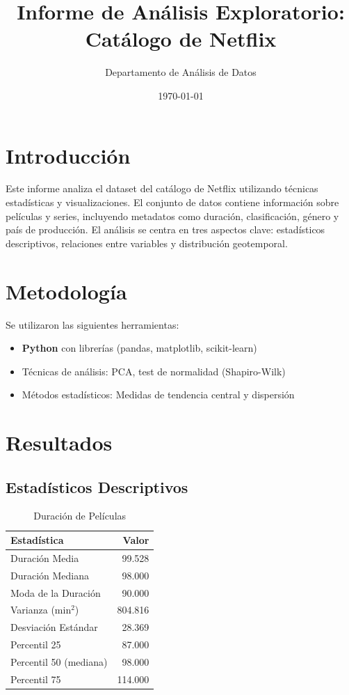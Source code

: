 \documentclass{article}
\title{Informe de Análisis Exploratorio: Catálogo de Netflix}
\author{Departamento de Análisis de Datos}
\date{\today}
\begin{document}
\maketitle

\section{Introducción}
Este informe analiza el dataset del catálogo de Netflix utilizando técnicas estadísticas y visualizaciones. El conjunto de datos contiene información sobre películas y series, incluyendo metadatos como duración, clasificación, género y país de producción. El análisis se centra en tres aspectos clave: estadísticos descriptivos, relaciones entre variables y distribución geotemporal.

\section{Metodología}
Se utilizaron las siguientes herramientas:
\begin{itemize}
\item \textbf{Python} con librerías (pandas, matplotlib, scikit-learn)
\item Técnicas de análisis: PCA, test de normalidad (Shapiro-Wilk)
\item Métodos estadísticos: Medidas de tendencia central y dispersión
\end{itemize}



\section{Resultados}

\subsection{Estadísticos Descriptivos}

\begin{table}[H]
    \centering
    \begin{tabular}{|l|r|}
    \hline
    \textbf{Estadística} & \textbf{Valor} \\
    \hline
    Duración Media & 99.528 \\
    Duración Mediana & 98.000 \\
    Moda de la Duración & 90.000 \\
    Varianza (min$^2$) & 804.816 \\
    Desviación Estándar & 28.369 \\
    Percentil 25 & 87.000 \\
    Percentil 50 (mediana) & 98.000 \\
    Percentil 75 & 114.000 \\
    \hline
    \end{tabular}
    \caption{Duración de Películas}
    \label{tab:estadisticas_duracion_peliculas}
\end{table}
\end{document}
